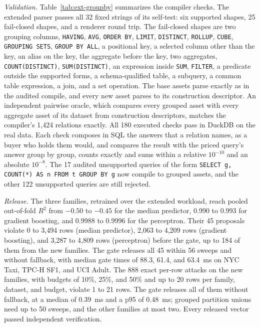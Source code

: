 \documentclass[10pt]{article}
\begin{document}
\emph{Validation.} Table~\ref{tab:ext-groupby} summarizes the compiler checks. The extended parser passes all 32 fixed strings of its self-test: six supported shapes, 25 fail-closed shapes, and a renderer round trip. The fail-closed shapes are two grouping columns, \texttt{HAVING}, \texttt{AVG}, \texttt{ORDER BY}, \texttt{LIMIT}, \texttt{DISTINCT}, \texttt{ROLLUP}, \texttt{CUBE}, \texttt{GROUPING SETS}, \texttt{GROUP BY ALL}, a positional key, a selected column other than the key, an alias on the key, the aggregate before the key, two aggregates, \texttt{COUNT(DISTINCT)}, \texttt{SUM(DISTINCT)}, an expression inside \texttt{SUM}, \texttt{FILTER}, a predicate outside the supported forms, a schema-qualified table, a subquery, a common table expression, a join, and a set operation. The base assets parse exactly as in the audited compile, and every new asset parses to its construction descriptor. An independent pairwise oracle, which compares every grouped asset with every aggregate asset of its dataset from construction descriptors, matches the compiler's 1{,}424 relations exactly. All 180 executed checks pass in DuckDB on the real data. Each check composes in SQL the answers that a relation names, as a buyer who holds them would, and compares the result with the priced query's answer group by group, counts exactly and sums within a relative $10^{-10}$ and an absolute $10^{-8}$. The 17 audited unsupported queries of the form \texttt{SELECT g, COUNT(*) AS n FROM t GROUP BY g} now compile to grouped assets, and the other 122 unsupported queries are still rejected.

\emph{Release.} The three families, retrained over the extended workload, reach pooled out-of-fold $R^2$ from $-0.50$ to $-0.45$ for the median predictor, 0.990 to 0.993 for gradient boosting, and 0.9988 to 0.9996 for the perceptron. Their 45 proposals violate 0 to 3{,}494 rows (median predictor), 2{,}063 to 4{,}209 rows (gradient boosting), and 3{,}287 to 4{,}809 rows (perceptron) before the gate, up to 184 of them from the new families. The gate releases all 45 within 56 sweeps and without fallback, with median gate times of 88.3, 61.4, and 63.4~ms on NYC Taxi, TPC-H SF1, and UCI Adult. The 888 exact per-row attacks on the new families, with budgets of 10\%, 25\%, and 50\% and up to 20 rows per family, dataset, and budget, violate 1 to 21 rows. The gate releases all of them without fallback, at a median of 0.39~ms and a p95 of 0.48~ms; grouped partition unions need up to 50 sweeps, and the other families at most two. Every released vector passed independent verification.
\end{document}
